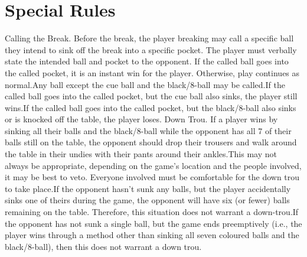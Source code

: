 \section{Special Rules} \label{8ball:special}
\label{8ball:callingthebreak} Calling the Break. Before the break, the player breaking may call a specific ball they intend to sink off the break into a specific pocket. The player must verbally state the intended ball and pocket to the opponent. If the called ball goes into the called pocket, it is an instant win for the player. Otherwise, play continues as normal.\itemspace Any ball except the cue ball and the black/8-ball may be called.\itemspace If the called ball goes into the called pocket, but the cue ball also sinks, the player still wins.\itemspace If the called ball goes into the called pocket, but the black/8-ball also sinks or is knocked off the table, the player loses.%
 Down Trou. If a player wins by sinking all their balls and the black/8-ball while the opponent has all 7 of their balls still on the table, the opponent should drop their trousers and walk around the table in their undies with their pants around their ankles.\itemspace This may not always be appropriate, depending on the game's location and the people involved, it may be best to veto. Everyone involved must be comfortable for the down trou to take place.\itemspace If the opponent hasn’t sunk any balls, but the player accidentally sinks one of theirs during the game, the opponent will have six (or fewer) balls remaining on the table. Therefore, this situation does not warrant a down-trou.\itemspace If the opponent has not sunk a single ball, but the game ends preemptively (i.e., the player wins through a method other than sinking all seven coloured balls and the black/8-ball), then this does not warrant a down trou.%


